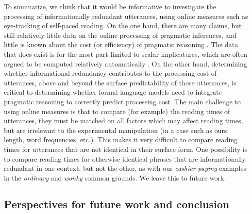 To summarize, we think that it would be informative to investigate the
processing of informationally redundant utterances, using online
measures such as eye-tracking of self-paced reading. On the one hand,
there are many claims, but still relatively little data on the online
processing of pragmatic inferences, and little is known about the cost
(or efficiency) of pragmatic reasoning \citep{Degen2016}. The
data that does exist is for the most part limited to scalar
implicatures, which are often argued to be computed relatively
automatically \citep[but see][]{Huang2009}. On the other hand,
determining whether informational redundancy contributes to the
processing cost of utterances, above and beyond the surface
predictability of those utterances, is critical to determining whether
formal language models need to integrate pragmatic reasoning to
correctly predict processing cost. The main challenge to using online
measures is that to compare (for example) the reading times of
utterances, they must be matched on all factors which may affect reading
times, but are irrelevant to the experimental manipulation (in a case
such as ours: length, word frequencies, etc.). This makes it very
difficult to compare reading times for utterances that are not identical
in their surface form. One possibility is to compare reading times for
otherwise identical phrases that are informationally redundant in one
context, but not the other, as with our \emph{cashier-paying} examples
in the \emph{ordinary} and \emph{wonky} common grounds. We leave this to
future work.

\subsection{Perspectives for future work and
conclusion}\label{perspectives-for-future-work-and-conclusion}

